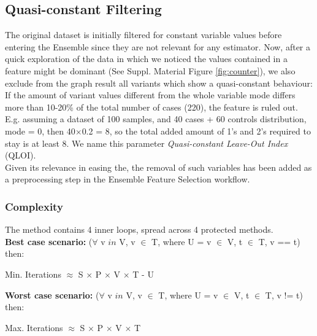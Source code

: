 
\subsection{Quasi-constant Filtering}
The original dataset is initially filtered for constant variable values before entering the Ensemble since they are not relevant for any estimator. Now, after a quick exploration of the data in which we noticed the values contained in a feature might be dominant (See Suppl. Material Figure \ref{fig:counter}), we also exclude from the graph result all variants which show a quasi-constant behaviour: If the amount of variant values different from the whole variable mode differs more than 10-20\% of the total number of cases (220), the feature is ruled out. E.g. assuming a dataset of 100 samples, and 40 cases + 60 controls distribution, mode = 0, then 40$\times$0.2 = 8, so the total added amount of 1's and 2's required to stay is at least 8.
We name this parameter \emph{Quasi-constant Leave-Out Index} (QLOI).
\\

Given its relevance in easing the, the removal of such variables has been added as a preprocessing step in the Ensemble Feature Selection workflow.

\subsubsection{Complexity}
\label{section:methods:complex}
The method contains 4 inner loops, spread across 4 protected methods.
\\

\textbf{Best case scenario:} ($\forall$ v $in$ V, v  $\in$  T, where U = v  $\in$  V, t  $\in$  T, v == t) then:
\begin{center}
Min. Iterations $\approx$ S $\times$ P $\times$ V $\times$ T - U\\    
\end{center}

\textbf{Worst case scenario:} ($\forall$ v $in$ V, v  $\in$  T, where U = v  $\in$  V, t  $\in$  T, v != t) then:
\begin{center}
Max. Iterations $\approx$ S $\times$ P $\times$ V $\times$ T\\    
\end{center}


